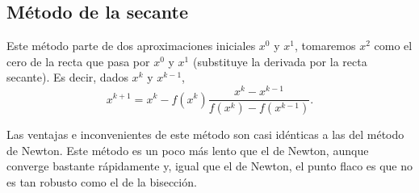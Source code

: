 \begin{center}
\end{center}

\subsection{Método de la secante}

Este método parte de dos aproximaciones iniciales $x^0$ y $x^1$, tomaremos $x^2$ como el cero de la recta
que pasa por $x^0$ y $x^1$ (substituye la derivada por la recta secante). Es decir, dados $x^k$ y $x^{k-1}$,
\[
    x^{k+1} = x^k - f\left( x^k \right) \frac{x^k - x^{k-1}}{f\left( x^k \right) - f\left( x^{k-1} \right)}.
\]

Las ventajas e inconvenientes de este método son casi idénticas a las del método de Newton. Este método
es un poco más lento que el de Newton, aunque converge bastante rápidamente y, igual que el de Newton,
el punto flaco es que no es tan robusto como el de la bisección.

